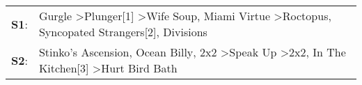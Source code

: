 \begin{supertabular}{p{0.03\textwidth}p{0.92\textwidth}}
 \textbf{S1}:  &  Gurgle\textsuperscript{} \textgreater \enspace Plunger[1]\textsuperscript{} \textgreater \enspace Wife Soup\textsuperscript{}, \enspace Miami Virtue\textsuperscript{} \textgreater \enspace Roctopus\textsuperscript{}, \enspace Syncopated Strangers[2]\textsuperscript{}, \enspace Divisions\textsuperscript{}  \enspace  \\
 \textbf{S2}:  &     Stinko's Ascension\textsuperscript{}, \enspace Ocean Billy\textsuperscript{}, \enspace 2x2\textsuperscript{} \textgreater \enspace Speak Up\textsuperscript{} \textgreater \enspace 2x2\textsuperscript{}, \enspace In The Kitchen[3]\textsuperscript{} \textgreater \enspace Hurt Bird Bath\textsuperscript{}  \enspace  \\
\end{supertabular}
